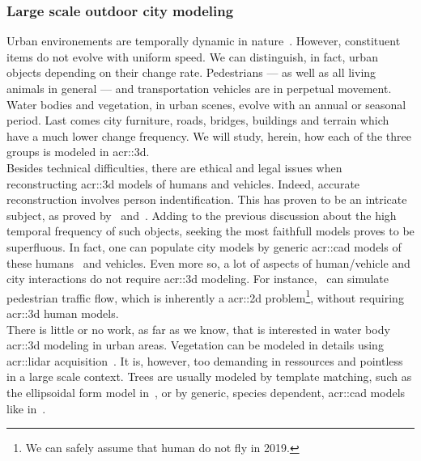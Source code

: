         \subsubsection{Large scale outdoor city modeling}
            Urban environements are temporally dynamic in nature~\parencite{Vanhoey:2017:VVS:3084363.3085085}.
            However, constituent items do not evolve with uniform speed.
            We can distinguish, in fact, urban objects depending on their change rate.
            Pedestrians --- as well as all living animals in general --- and transportation vehicles are in perpetual movement.
            Water bodies and vegetation, in urban scenes, evolve with an annual or seasonal period.
            Last comes city furniture, roads, bridges, buildings and terrain which have a much lower change frequency.
            We will study, herein, how each of the three groups is modeled in \gls{acr::3d}.\\

            Besides technical difficulties, there are ethical and legal issues when reconstructing \gls{acr::3d} models of humans and vehicles.
            Indeed, accurate reconstruction involves person indentification.
            This has proven to be an intricate subject, as proved by~\textcite{tavani2011ethics} and~\textcite{thornton2010individual}.
            Adding to the previous discussion about the high temporal frequency of such objects, seeking the most faithfull models proves to be superfluous.
            In fact, one can populate city models by generic \gls{acr::cad} models of these humans~\parencite{shao2007autonomous} and vehicles.
            Even more so, a lot of aspects of human/vehicle and city interactions do not require \gls{acr::3d} modeling.
            For instance,~\textcite{lovaas1994modeling} can simulate pedestrian traffic flow, which is inherently a \gls{acr::2d} problem\footnote{
                We can safely assume that human do not fly in 2019.
            }, without requiring \gls{acr::3d} human models.\\
            There is little or no work, as far as we know, that is interested in water body \gls{acr::3d} modeling in urban areas.
            Vegetation can be modeled in details using \gls{acr::lidar} acquisition~\parencite{omasa20063d}.
            It is, however, too demanding in ressources and pointless in a large scale context.
            Trees are usually modeled by template matching, such as the ellipsoidal form model in~\textcite{lafarge_ijcv12}, or by generic, species dependent, \gls{acr::cad} models like in~\textcite{iovan2008detection}.\\

